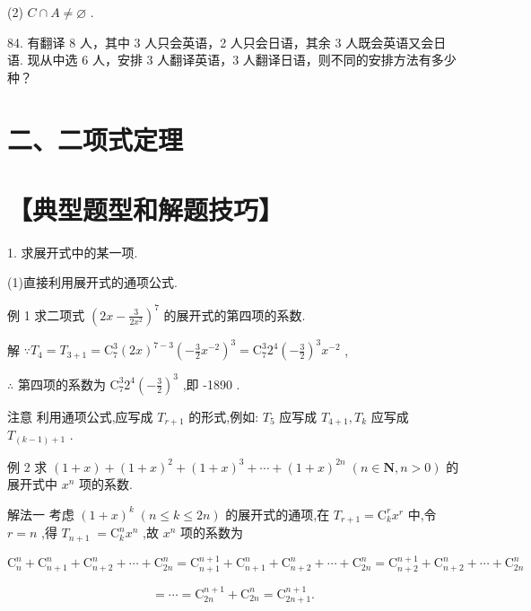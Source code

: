 \documentclass[10pt]{article}
\begin{document}
(2) \(C \cap  A \neq  \varnothing\) .

84. 有翻译 8 人，其中 3 人只会英语，2 人只会日语，其余 3 人既会英语又会日语. 现从中选 6 人，安排 3 人翻译英语，3 人翻译日语，则不同的安排方法有多少种？

\section*{二、二项式定理}

\section*{【典型题型和解题技巧】}

1. 求展开式中的某一项.

(1)直接利用展开式的通项公式.

例 1 求二项式 \({\left( 2x - \frac{3}{2{x}^{2}}\right) }^{7}\) 的展开式的第四项的系数.

解 \(\because {T}_{4} = {T}_{3 + 1} = {\mathrm{C}}_{7}^{3}{\left( 2x\right) }^{7 - 3}{\left( -\frac{3}{2}{x}^{-2}\right) }^{3} = {\mathrm{C}}_{7}^{3}{2}^{4}{\left( -\frac{3}{2}\right) }^{3}{x}^{-2}\) ,

\(\therefore\) 第四项的系数为 \({\mathrm{C}}_{7}^{3}{2}^{4}{\left( -\frac{3}{2}\right) }^{3}\) ,即 -1890 .

注意 利用通项公式,应写成 \({T}_{r + 1}\) 的形式,例如: \({T}_{5}\) 应写成 \({T}_{4 + 1},{T}_{k}\) 应写成 \({T}_{\left( {k - 1}\right)  + 1}\) .

例 2 求 \(\left( {1 + x}\right)  + {\left( 1 + x\right) }^{2} + {\left( 1 + x\right) }^{3} + \cdots  + {\left( 1 + x\right) }^{2n}\;\left( {n \in  \mathbf{N},n > 0}\right)\) 的展开式中 \({x}^{n}\) 项的系数.

解法一 考虑 \({\left( 1 + x\right) }^{k}\;\left( {n \leq  k \leq  {2n}}\right)\) 的展开式的通项,在 \({T}_{r + 1} = {\mathrm{C}}_{k}^{r}{x}^{r}\) 中,令 \(r = n\) ,得 \({T}_{n + 1} \; = {\mathrm{C}}_{k}^{n}{x}^{n}\) ,故 \({x}^{n}\) 项的系数为

\[
{\mathrm{C}}_{n}^{n} + {\mathrm{C}}_{n + 1}^{n} + {\mathrm{C}}_{n + 2}^{n} + \cdots  + {\mathrm{C}}_{2n}^{n} = {\mathrm{C}}_{n + 1}^{n + 1} + {\mathrm{C}}_{n + 1}^{n} + {\mathrm{C}}_{n + 2}^{n} + \cdots  + {\mathrm{C}}_{2n}^{n} = {\mathrm{C}}_{n + 2}^{n + 1} + {\mathrm{C}}_{n + 2}^{n} + \cdots  + {\mathrm{C}}_{2n}^{n}
\]

\[
= \cdots  = {\mathrm{C}}_{2n}^{n + 1} + {\mathrm{C}}_{2n}^{n} = {\mathrm{C}}_{{2n} + 1}^{n + 1}.
\]
\end{document}
